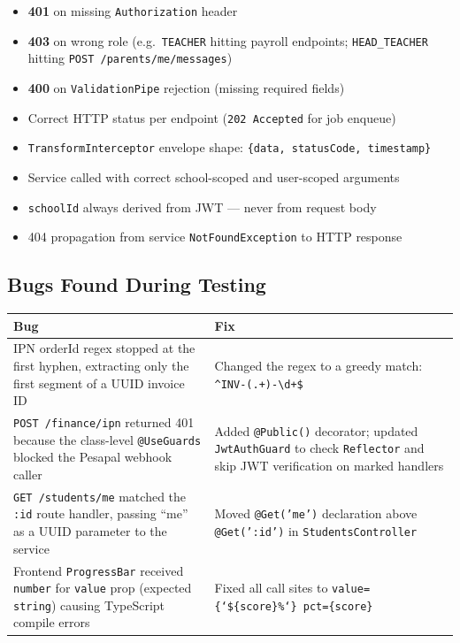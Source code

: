 \documentclass[11pt, a4paper]{article}
\newcommand{\code}[1]{\texttt{\small #1}}
\begin{document}
\begin{itemize}[leftmargin=1.5em, itemsep=2pt]
  \item \textbf{401} on missing \code{Authorization} header
  \item \textbf{403} on wrong role (e.g.\ \code{TEACHER} hitting payroll
    endpoints; \code{HEAD\_TEACHER} hitting \code{POST /parents/me/messages})
  \item \textbf{400} on \code{ValidationPipe} rejection (missing required fields)
  \item Correct HTTP status per endpoint (\code{202 Accepted} for job enqueue)
  \item \code{TransformInterceptor} envelope shape: \code{\{data, statusCode, timestamp\}}
  \item Service called with correct school-scoped and user-scoped arguments
  \item \code{schoolId} always derived from JWT --- never from request body
  \item 404 propagation from service \code{NotFoundException} to HTTP response
\end{itemize}

\subsection{Bugs Found During Testing}

\begin{tabular}{@{}p{4.8cm} p{9.2cm}@{}}
  \toprule
  Bug & Fix \\
  \midrule
  IPN orderId regex stopped at the first hyphen, extracting only the first
  segment of a UUID invoice ID &
  Changed the regex to a greedy match: \verb|^INV-(.+)-\d+$| \\
  \addlinespace[6pt]
  \code{POST /finance/ipn} returned 401 because the class-level
  \code{@UseGuards} blocked the Pesapal webhook caller &
  Added \code{@Public()} decorator; updated \code{JwtAuthGuard} to
  check \code{Reflector} and skip JWT verification on marked handlers \\
  \addlinespace[6pt]
  \code{GET /students/me} matched the \code{:id} route handler,
  passing ``me'' as a UUID parameter to the service &
  Moved \code{@Get('me')} declaration above \code{@Get(':id')} in
  \code{StudentsController} \\
  \addlinespace[6pt]
  Frontend \code{ProgressBar} received \code{number} for \code{value}
  prop (expected \code{string}) causing TypeScript compile errors &
  Fixed all call sites to \code{value=\{`\$\{score\}\%`\} pct=\{score\}} \\
  \bottomrule
\end{tabular}
\end{document}

